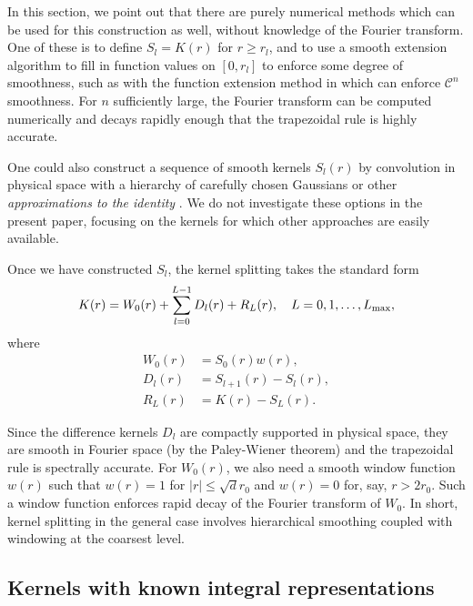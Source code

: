 \documentclass[final,letterpaper]{siamart171218}
\newcommand{\be}{\begin{equation}}
\newcommand{\ee}{\end{equation}}
\newcommand{\ba}{\begin{aligned}}
\newcommand{\ea}{\end{aligned}}
\newcommand{\cR}{r}
\begin{document}
In this section, we point out that there are purely numerical methods which can be used
for this construction as well, without knowledge of the Fourier transform.
One of these is to define $S_l = K(r)$ for $r\ge \cR_l$, and to use a smooth extension
algorithm to fill in function values on $[0,\cR_l]$ to enforce some degree of smoothness,
such as with the function extension method in 
\cite{epstein2022arxiv} which can enforce $\mathcal{C}^n$ smoothness. For $n$ sufficiently
large, the Fourier transform can be computed numerically and 
decays rapidly enough that the trapezoidal rule is highly accurate.

One could also construct a sequence of smooth kernels $S_l(r)$ by convolution 
in physical space with a hierarchy of carefully chosen Gaussians or other 
{\em approximations to the identity} \cite{stein1971}. We do not investigate these
options in the present paper, focusing on the kernels for which other approaches are
easily available. 


Once we have constructed $S_l$, the kernel splitting takes the standard form
\be\label{generalkernelsplitting2}
K(r) = W_0(r) + \sum_{l=0}^{L-1}D_l(r) + R_L(r), \quad L=0,1,\ldots,L_{\rm max},
\ee
where
\be\label{generalkernels}
\ba
W_0(r) &= S_{0}(r) w(r),\\
D_l(r) &= S_{l+1}(r)-S_l(r),\\
R_L(r) &= K(r)-S_L(r).
\ea
\ee

Since the difference kernels $D_l$ are compactly supported in physical space, they  
are smooth in Fourier space (by the Paley-Wiener theorem)
and the trapezoidal rule is spectrally accurate.
For $W_0(r)$, we also need a smooth window function
$w(r)$ such that $w(r)=1$ for $|r|\le \sqrt{d}\cR_0$
and $w(r)=0$ for, say, $r>2\cR_0$. Such a window function enforces rapid decay of the Fourier
transform of $W_0$. In short, kernel splitting in the general case involves
hierarchical smoothing coupled with windowing at the coarsest level.


\subsection{Kernels with known integral representations}
\end{document}
